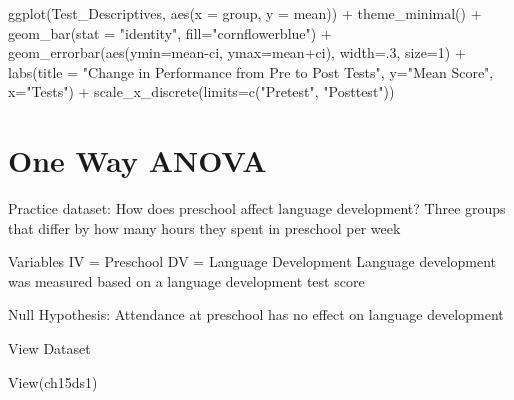 \documentclass[
]{book}
\newenvironment{Shaded}{\begin{snugshade}}{\end{snugshade}}
\newcommand{\AttributeTok}[1]{\textcolor[rgb]{0.77,0.63,0.00}{#1}}
\newcommand{\DecValTok}[1]{\textcolor[rgb]{0.00,0.00,0.81}{#1}}
\newcommand{\FunctionTok}[1]{\textcolor[rgb]{0.00,0.00,0.00}{#1}}
\newcommand{\NormalTok}[1]{#1}
\newcommand{\SpecialCharTok}[1]{\textcolor[rgb]{0.00,0.00,0.00}{#1}}
\newcommand{\StringTok}[1]{\textcolor[rgb]{0.31,0.60,0.02}{#1}}
\begin{document}
\begin{Shaded}
\begin{Highlighting}[]
\FunctionTok{ggplot}\NormalTok{(Test\_Descriptives, }
       \FunctionTok{aes}\NormalTok{(}\AttributeTok{x =}\NormalTok{ group,}
           \AttributeTok{y =}\NormalTok{ mean)) }\SpecialCharTok{+}
  \FunctionTok{theme\_minimal}\NormalTok{() }\SpecialCharTok{+}
  \FunctionTok{geom\_bar}\NormalTok{(}\AttributeTok{stat =} \StringTok{"identity"}\NormalTok{, }\AttributeTok{fill=}\StringTok{"cornflowerblue"}\NormalTok{) }\SpecialCharTok{+}
  \FunctionTok{geom\_errorbar}\NormalTok{(}\FunctionTok{aes}\NormalTok{(}\AttributeTok{ymin=}\NormalTok{mean}\SpecialCharTok{{-}}\NormalTok{ci,}
                    \AttributeTok{ymax=}\NormalTok{mean}\SpecialCharTok{+}\NormalTok{ci), }\AttributeTok{width=}\NormalTok{.}\DecValTok{3}\NormalTok{, }\AttributeTok{size=}\DecValTok{1}\NormalTok{) }\SpecialCharTok{+}
  \FunctionTok{labs}\NormalTok{(}\AttributeTok{title =} \StringTok{"Change in Performance from Pre to Post Tests"}\NormalTok{, }
       \AttributeTok{y=}\StringTok{"Mean Score"}\NormalTok{, }\AttributeTok{x=}\StringTok{"Tests"}\NormalTok{) }\SpecialCharTok{+}
  \FunctionTok{scale\_x\_discrete}\NormalTok{(}\AttributeTok{limits=}\FunctionTok{c}\NormalTok{(}\StringTok{"Pretest"}\NormalTok{, }\StringTok{"Posttest"}\NormalTok{))}
\end{Highlighting}
\end{Shaded}

\hypertarget{one-way-anova}{%
\chapter{One Way ANOVA}\label{one-way-anova}}

Practice dataset: How does preschool affect language development?
Three groups that differ by how many hours they spent in preschool per week

Variables
IV = Preschool
DV = Language Development
Language development was measured based on a language development test score

Null Hypothesis: Attendance at preschool has no effect on language development

View Dataset

\begin{Shaded}
\begin{Highlighting}[]
\FunctionTok{View}\NormalTok{(ch15ds1)}
\end{Highlighting}
\end{Shaded}
\end{document}
